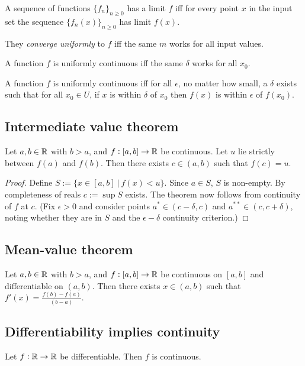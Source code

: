 \begin{definition*}
A sequence of functions $\{f_n\}_{n\geq 0}$ has a limit $f$ iff for every point
$x$ in the input set the sequence $\{f_n(x)\}_{n\geq 0}$ has limit $f(x)$.

They \textit{converge uniformly} to $f$ iff the same $m$ works for all input
values.
\end{definition*}

\begin{definition*}
A function $f$ is uniformly continuous iff the same $\delta$ works for all $x_0$.

A function $f$ is uniformly continuous iff for all $\epsilon$, no matter how
small, a $\delta$ exists such that for all $x_0 \in U$, if $x$ is within
$\delta$ of $x_0$ then $f(x)$ is within $\epsilon$ of $f(x_0)$.
\end{definition*}

\subsection{Intermediate value theorem}
\begin{theorem*}
  Let $a, b \in \mathbb{R}$ with $b > a$, and $f:[a,b] \to \mathbb{R}$ be continuous. Let $u$ lie strictly between
  $f(a)$ and $f(b)$. Then there exists $c \in (a, b)$ such that $f(c) = u$.
\end{theorem*}

\begin{proof}
  Define $S := \{x \in [a, b] ~|~ f(x) < u\}$. Since $a \in S$, $S$ is non-empty. By completeness
  of reals $c := \sup S$ exists. The theorem now follows from continuity of $f$ at $c$. (Fix
  $\epsilon > 0$ and consider points $a^* \in (c - \delta, c)$ and $a^{**} \in (c, c + \delta)$,
  noting whether they are in $S$ and the $\epsilon-\delta$ continuity criterion.)
\end{proof}


\subsection{Mean-value theorem}
\begin{theorem*}
  Let $a, b \in \mathbb{R}$ with $b > a$, and $f:[a,b] \to \mathbb{R}$ be continuous on $[a, b]$ and differentiable
  on $(a, b)$. Then there exists $x \in (a, b)$ such that $f'(x) = \frac{f(b) - f(a)}{(b - a)}$.
\end{theorem*}


\subsection{Differentiability implies continuity}
\begin{theorem*}
  Let $f:\mathbb{R}\to\mathbb{R}$ be differentiable. Then $f$ is continuous.
\end{theorem*}

